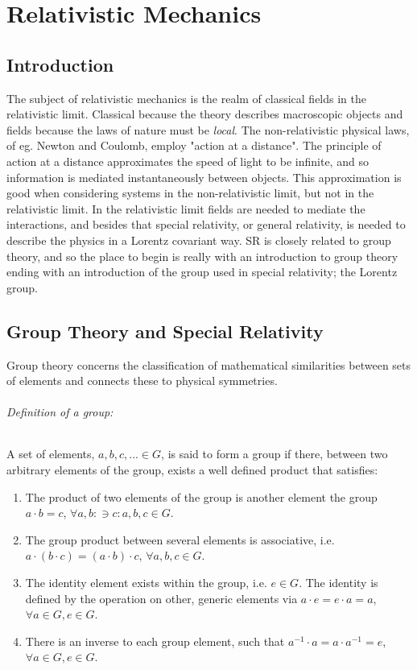 \part{Relativistic Mechanics}

\chapter*{Introduction}
The subject of relativistic mechanics is the realm of classical fields in the relativistic limit. Classical because the theory describes macroscopic objects and fields because the laws of nature must be \emph{local}. The non-relativistic physical laws, of eg. Newton and Coulomb, employ "action at a distance". The principle of action at a distance approximates the speed of light to be infinite, and so information is mediated instantaneously between objects. This approximation is good when considering systems in the non-relativistic limit, but not in the relativistic limit. In the relativistic limit fields are needed to mediate the interactions, and besides that special relativity, or general relativity, is needed to describe the physics in a Lorentz covariant way. SR is closely related to group theory, and so the place to begin is really with an introduction to group theory ending with an introduction of the group used in special relativity; the Lorentz group. 

\chapter{Group Theory and Special Relativity}
\label{chp:group theory}
Group theory concerns the classification of mathematical similarities between sets of elements and connects these to physical symmetries. 
\paragraph{Definition of a group: }
A set of elements, $a,b,c,...\in G$, is said to form a group if there, between two arbitrary elements of the group, exists a well defined product that satisfies:
\begin{enumerate}
	\item The product of two elements of the group is another element the group $a\cdot b=c$, $\forall a,b:\ni c:a,b,c\in G$.
	\item The group product between several elements is associative, i.e. $a\cdot(b\cdot c)=(a\cdot b)\cdot c$, $\forall a,b,c\in G$.
	\item The identity element exists within the group, i.e. $e\in G$. The identity is defined by the operation on other, generic elements via $a\cdot e=e\cdot a=a$, $\forall a\in G, e\in G$.
	\item There is an inverse to each group element, such that $a^{-1}\cdot a=a\cdot a^{-1}=e$, $\forall a\in G, e\in G$.
\end{enumerate}
